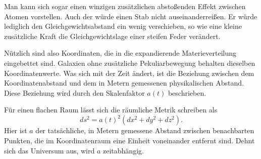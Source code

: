 \begin{classroomqa}
\end{classroomqa}

Man kann sich sogar einen winzigen zusätzlichen abstoßenden Effekt zwischen Atomen vorstellen. Auch der würde einen Stab nicht auseinanderreißen. Er würde lediglich den Gleichgewichtsabstand ein wenig verschieben, so wie eine kleine zusätzliche Kraft die Gleichgewichtslage einer steifen Feder verändert.

\begin{classroomqa}
\end{classroomqa}

Nützlich sind also Koordinaten, die in die expandierende Materieverteilung eingebettet sind. Galaxien ohne zusätzliche Pekuliarbewegung behalten dieselben Koordinatenwerte. Was sich mit der Zeit ändert, ist die Beziehung zwischen dem Koordinatenabstand und dem in Metern gemessenen physikalischen Abstand. Diese Beziehung wird durch den Skalenfaktor \(a(t)\) beschrieben.

Für einen flachen Raum lässt sich die räumliche Metrik schreiben als
\begin{equation}
ds^2 = a(t)^2\left(dx^2+dy^2+dz^2\right).
\end{equation}
Hier ist \(a\) der tatsächliche, in Metern gemessene Abstand zwischen benachbarten Punkten, die im Koordinatenraum eine Einheit voneinander entfernt sind. Dehnt sich das Universum aus, wird \(a\) zeitabhängig.

